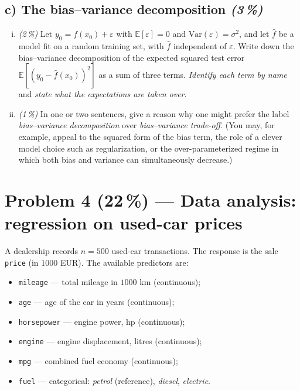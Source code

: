 \documentclass[11pt,a4paper]{article}
\newcommand{\points}[1]{\textbf{(#1\,\%)}}
\newcommand{\subpoints}[1]{\textit{(#1\,\%)}}
\begin{document}
\subsection*{c) The bias--variance decomposition \subpoints{3}}

\begin{enumerate}[(i)]
  \item \subpoints{2} Let $y_0 = f(x_0) + \varepsilon$ with $\mathbb{E}[\varepsilon] = 0$ and $\mathrm{Var}(\varepsilon) = \sigma^2$, and let $\hat f$ be a model fit on a random training set, with $\hat f$ independent of $\varepsilon$. Write down the bias--variance decomposition of the expected squared test error $\mathbb{E}\!\left[(y_0 - \hat f(x_0))^2\right]$ as a sum of three terms. \emph{Identify each term by name} and \emph{state what the expectations are taken over}.
  \item \subpoints{1} In one or two sentences, give a reason why one might prefer the label \emph{bias--variance decomposition} over \emph{bias--variance trade-off}. (You may, for example, appeal to the squared form of the bias term, the role of a clever model choice such as regularization, or the over-parameterized regime in which both bias and variance can simultaneously decrease.)
\end{enumerate}

\vfill\eject

\section*{Problem 4 \points{22} --- Data analysis: regression on used-car prices}

A dealership records $n = 500$ used-car transactions. The response is the sale \texttt{price} (in $1000$ EUR). The available predictors are:
\begin{itemize}
  \item \texttt{mileage} --- total mileage in $1000$ km (continuous);
  \item \texttt{age} --- age of the car in years (continuous);
  \item \texttt{horsepower} --- engine power, hp (continuous);
  \item \texttt{engine} --- engine displacement, litres (continuous);
  \item \texttt{mpg} --- combined fuel economy (continuous);
  \item \texttt{fuel} --- categorical: \emph{petrol} (reference), \emph{diesel}, \emph{electric}.
\end{itemize}
\end{document}
